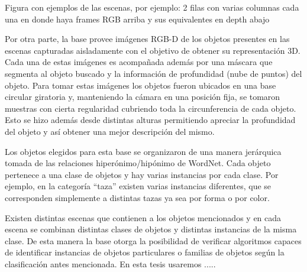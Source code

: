 {\huge Figura con ejemplos de las escenas, por ejemplo: 2 filas con varias columnas cada una en donde haya frames RGB arriba y sus equivalentes en depth abajo}

Por otra parte, la base provee imágenes RGB-D de los objetos presentes en las escenas capturadas aisladamente con el objetivo de obtener su representación 3D. Cada una de estas imágenes es acompañada además por una máscara que segmenta al objeto buscado y la información de profundidad (nube de puntos) del objeto. Para tomar estas imágenes los objetos fueron ubicados en una base circular giratoria y, manteniendo la cámara en una posición fija, se tomaron muestras con cierta regularidad cubriendo toda la circunferencia de cada objeto. Esto se hizo además desde distintas alturas permitiendo apreciar la profundidad del objeto y así obtener una mejor descripción del mismo.

Los objetos elegidos para esta base se organizaron de una manera jerárquica tomada de las relaciones hiperónimo/hipónimo de WordNet. Cada objeto pertenece a una clase de objetos y hay varias instancias por cada clase. Por ejemplo, en la categoría ``taza'' existen varias instancias diferentes, que se corresponden simplemente a distintas tazas ya sea por forma o por color.

Existen distintas escenas que contienen a los objetos mencionados y en cada escena se combinan distintas clases de objetos y distintas instancias de la misma clase. De esta manera la base otorga la posibilidad de verificar algoritmos capaces de identificar instancias de objetos particulares o familias de objetos según la clasificación antes mencionada. En esta tesis usaremos .....
